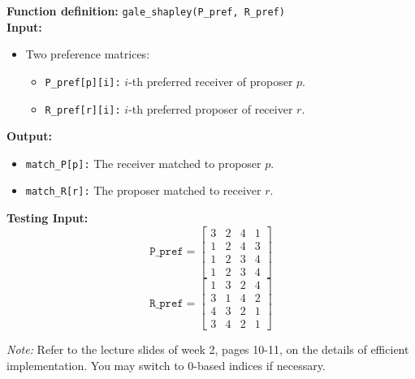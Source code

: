 \documentclass[12pt]{article}
\begin{document}
\textbf{Function definition:} \texttt{gale\_shapley(P\_pref, R\_pref)} \\

\textbf{Input:}
\begin{itemize}
    \item Two preference matrices:
    \begin{itemize}
        \item \texttt{P\_pref[p][i]:} $i$-th preferred receiver of proposer $p$.
        \item \texttt{R\_pref[r][i]:} $i$-th preferred proposer of receiver $r$.
    \end{itemize}
\end{itemize}

\textbf{Output:}
\begin{itemize}
    \item \texttt{match\_P[p]:} The receiver matched to proposer $p$.
    \item \texttt{match\_R[r]:} The proposer matched to receiver $r$.
\end{itemize}

\textbf{Testing Input:}
\[
\texttt{P\_pref} = 
\begin{bmatrix}
3 & 2 & 4 & 1 \\
1 & 2 & 4 & 3 \\
1 & 2 & 3 & 4 \\
1 & 2 & 3 & 4
\end{bmatrix}
\]
\[
\texttt{R\_pref} = 
\begin{bmatrix}
1 & 3 & 2 & 4 \\
3 & 1 & 4 & 2 \\
4 & 3 & 2 & 1 \\
3 & 4 & 2 & 1
\end{bmatrix}
\]

\textit{Note:} Refer to the lecture slides of week 2, pages 10-11, on the details of efficient implementation. You may switch to 0-based indices if necessary.
\end{document}
